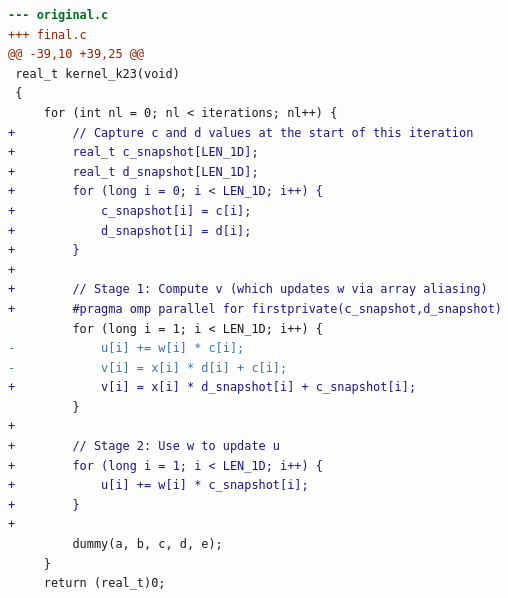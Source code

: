 \begin{lstlisting}[language=diff,basicstyle=\ttfamily\scriptsize,breaklines=true,caption={tsvc_c2/k23 — BROKEN (e2v6_fb_1)}]
--- original.c
+++ final.c
@@ -39,10 +39,25 @@
 real_t kernel_k23(void)
 {
     for (int nl = 0; nl < iterations; nl++) {
+        // Capture c and d values at the start of this iteration
+        real_t c_snapshot[LEN_1D];
+        real_t d_snapshot[LEN_1D];
+        for (long i = 0; i < LEN_1D; i++) {
+            c_snapshot[i] = c[i];
+            d_snapshot[i] = d[i];
+        }
+
+        // Stage 1: Compute v (which updates w via array aliasing)
+        #pragma omp parallel for firstprivate(c_snapshot,d_snapshot) 
         for (long i = 1; i < LEN_1D; i++) {
-            u[i] += w[i] * c[i];
-            v[i] = x[i] * d[i] + c[i];
+            v[i] = x[i] * d_snapshot[i] + c_snapshot[i];
         }
+
+        // Stage 2: Use w to update u
+        for (long i = 1; i < LEN_1D; i++) {
+            u[i] += w[i] * c_snapshot[i];
+        }
+
         dummy(a, b, c, d, e);
     }
     return (real_t)0;
\end{lstlisting}
